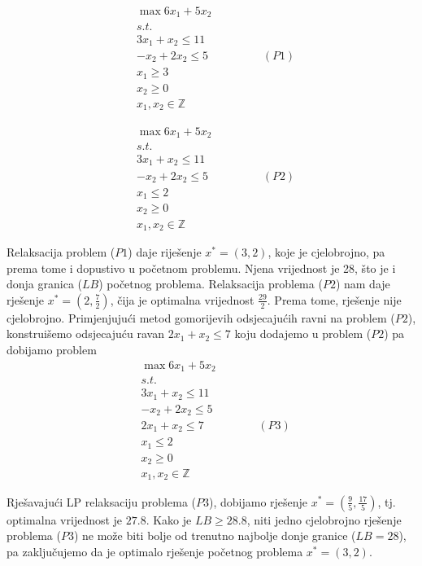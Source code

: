 \documentclass[a4paper, utf8, 11pt, colorlinks]{book}
\begin{document}
\begin{align*}
    &\max 6 x_1 + 5 x_2 \\
    & {s.t. } \\
    & 3x_1 + x_2 \leq 11 \\
    & - x_2 + 2 x_2 \leq 5 \hspace{2cm} (P1) \\
    & x_1 \geq 3 \\
    & x_2 \geq 0 \\
    & x_1, x_2 \in \mathbb{Z}
\end{align*}

\begin{align*}
    &\max 6 x_1 + 5 x_2 \\
    & {s.t. } \\
    & 3x_1 + x_2 \leq 11 \\
    & - x_2 + 2 x_2 \leq 5 \hspace{2cm} (P2) \\
    & x_1  \leq 2 \\
    & x_2 \geq 0 \\
    & x_1, x_2 \in \mathbb{Z}
\end{align*}

Relaksacija problem ($P1$) daje riješenje $x^*=(3,2)$, koje je cjelobrojno, pa prema tome i dopustivo u početnom problemu. Njena vrijednost je 28, što je i donja granica ($LB$) početnog problema. Relaksacija problema ($P2$) nam daje rješenje $x^*=(2, \frac{7}{2})$, čija je optimalna vrijednost $\frac{29}{2}$.  Prema tome, rješenje nije cjelobrojno. Primjenjujući metod gomorijevih odsjecajućih ravni na problem ($P2$), konstruišemo odsjecajuću ravan $2x_1 + x_2 \leq 7$ koju dodajemo u problem ($P2$) pa dobijamo problem 
\begin{align*}
    &\max 6 x_1 + 5 x_2 \\
    & {s.t. } \\
    & 3x_1 + x_2 \leq 11 \\
    & - x_2 + 2 x_2 \leq 5  \\
    & 2x_1 + x_2 \leq 7 \hspace{2cm} (P3)\\ 
    & x_1  \leq 2 \\
    & x_2 \geq 0 \\
    & x_1, x_2 \in \mathbb{Z}
\end{align*}

Rješavajući LP relaksaciju problema ($P3$), dobijamo rješenje $x^*=(\frac{9}{5}, \frac{17}{5})$, tj.  optimalna vrijednost je $27.8$. Kako je $LB \geq 28.8$, niti jedno cjelobrojno rješenje problema ($P3$) ne može biti bolje od trenutno najbolje donje granice ($LB=28$), pa zaključujemo da je optimalo rješenje početnog problema $x^*=(3,2)$. 
\end{document}
